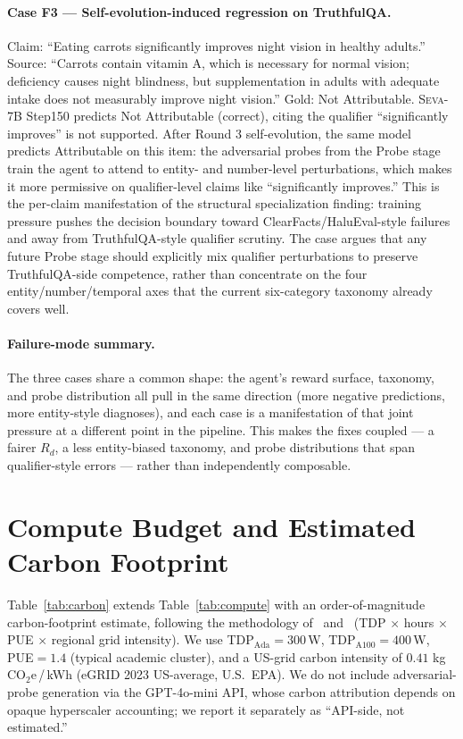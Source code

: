 \documentclass{article}
\newcommand{\seva}{\textsc{Seva}\xspace}
\begin{document}
\paragraph{Case F3 --- Self-evolution-induced regression on TruthfulQA.}
Claim: ``Eating carrots significantly improves night vision in healthy adults.''
Source: ``Carrots contain vitamin A, which is necessary for normal vision; deficiency causes night blindness, but supplementation in adults with adequate intake does not measurably improve night vision.''
Gold: Not Attributable.
\seva-7B Step150 predicts Not Attributable (correct), citing the qualifier ``significantly improves'' is not supported.
After Round 3 self-evolution, the same model predicts Attributable on this item: the adversarial probes from the Probe stage train the agent to attend to entity- and number-level perturbations, which makes it more permissive on qualifier-level claims like ``significantly improves.''
This is the per-claim manifestation of the structural specialization finding: training pressure pushes the decision boundary toward ClearFacts/HaluEval-style failures and away from TruthfulQA-style qualifier scrutiny.
The case argues that any future Probe stage should explicitly mix qualifier perturbations to preserve TruthfulQA-side competence, rather than concentrate on the four entity/number/temporal axes that the current six-category taxonomy already covers well.

\paragraph{Failure-mode summary.}
The three cases share a common shape: the agent's reward surface, taxonomy, and probe distribution all pull in the same direction (more negative predictions, more entity-style diagnoses), and each case is a manifestation of that joint pressure at a different point in the pipeline.
This makes the fixes coupled --- a fairer $R_d$, a less entity-biased taxonomy, and probe distributions that span qualifier-style errors --- rather than independently composable.


\section{Compute Budget and Estimated Carbon Footprint}
\label{app:carbon}

Table~\ref{tab:carbon} extends Table~\ref{tab:compute} with an order-of-magnitude carbon-footprint estimate, following the methodology of~\citet{lacoste2019quantify} and~\citet{strubell2019energy} (TDP $\times$ hours $\times$ PUE $\times$ regional grid intensity).
We use TDP$_{\text{Ada}}{=}300$\,W, TDP$_{\text{A100}}{=}400$\,W, PUE$=1.4$ (typical academic cluster), and a US-grid carbon intensity of $0.41$ kg\,CO$_2$e\,/\,kWh (eGRID 2023 US-average, U.S.~EPA).
We do not include adversarial-probe generation via the GPT-4o-mini API, whose carbon attribution depends on opaque hyperscaler accounting; we report it separately as ``API-side, not estimated.''
\end{document}
